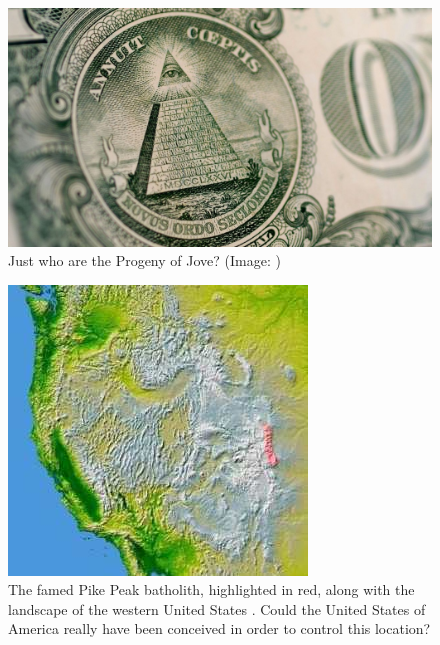 \documentclass[10pt,twocolumn,letterpaper]{article}
\begin{document}
\begin{figure}[t]
\begin{center}
   \includegraphics[width=1\linewidth]{illuminati.jpg}
\end{center}
   \caption{Just who are the Progeny of Jove? (Image: \cite{35})}
\label{fig:10}
\label{fig:onecol}
\end{figure}

\begin{figure}[t]
\begin{center}
   \includegraphics[width=1\linewidth]{pike.jpg}
\end{center}
   \caption{The famed Pike Peak batholith, highlighted in red, along with the landscape of the western United States \cite{36}. Could the United States of America really have been conceived in order to control this location?}
\label{fig:11}
\label{fig:onecol}
\end{figure}
\end{document}
